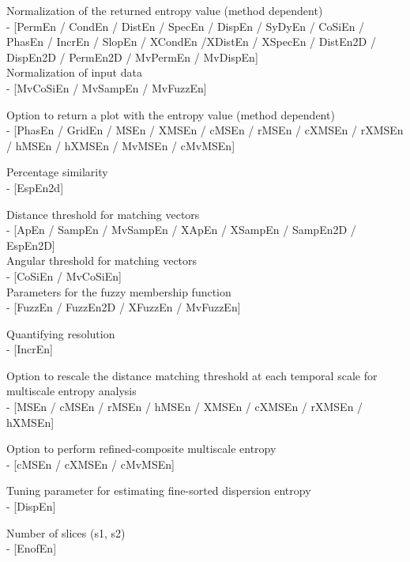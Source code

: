 \documentclass[12pt, a4paper, titlepage, openany]{book}
\begin{document}
\begin{description}[labelsep=1cm, labelwidth=2cm, nosep, style=multiline,leftmargin=3cm]
\item[\texttt{Norm}]		Normalization of the returned entropy value (method dependent) \\
 - [PermEn / CondEn / DistEn / SpecEn / DispEn / SyDyEn / CoSiEn / PhasEn / IncrEn / SlopEn / XCondEn /XDistEn / XSpecEn / DistEn2D / DispEn2D / PermEn2D / MvPermEn / MvDispEn]\\
 Normalization of input data \\
 - [MvCoSiEn / MvSampEn / MvFuzzEn]\\
\item[\texttt{Plotx}]		Option to return a plot with the entropy value (method dependent) \\
 - [PhasEn / GridEn / MSEn / XMSEn / cMSEn / rMSEn / cXMSEn / rXMSEn / hMSEn / hXMSEn / MvMSEn / cMvMSEn]\\
\item[\texttt{ps}]		Percentage similarity \\  - [EspEn2d]\\
\item[\texttt{r}]		Distance threshold for matching vectors \\  - [ApEn / SampEn / MvSampEn / XApEn / XSampEn / SampEn2D / EspEn2D]\\
 Angular threshold for matching vectors \\  - [CoSiEn / MvCoSiEn]\\
 Parameters for the fuzzy membership function \\ - [FuzzEn / FuzzEn2D / XFuzzEn / MvFuzzEn] \\
\item[\texttt{R}]		Quantifying resolution \\  - [IncrEn]\\
\item[\texttt{RadNew}]		Option to rescale the distance matching threshold at each temporal scale for multiscale entropy analysis \\  - [MSEn / cMSEn / rMSEn / hMSEn / XMSEn / cXMSEn / rXMSEn / hXMSEn]\\
\item[\texttt{Refined}]		Option to perform refined-composite multiscale entropy \\  - [cMSEn / cXMSEn / cMvMSEn]\\
\item[\texttt{rho}]		Tuning parameter for estimating fine-sorted dispersion entropy \\  - [DispEn]\\
\item[\texttt{S}]		Number of slices (s1, s2) \\  - [EnofEn]\\

\end{description}
\end{document}
